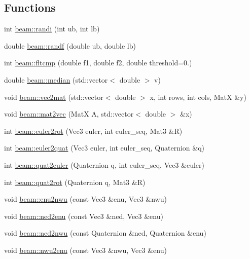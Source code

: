 \subsection*{Functions}
\begin{DoxyCompactItemize}
\item 
int \hyperlink{group__utils_ga1709c3968d710a88b5cc6b034358ff4b}{beam\+::randi} (int ub, int lb)
\item 
double \hyperlink{group__utils_gaf3391ec0a035372eb7fa27646aa97018}{beam\+::randf} (double ub, double lb)
\item 
int \hyperlink{group__utils_gacf5e889cd118230c90c1618324b47644}{beam\+::fltcmp} (double f1, double f2, double threshold=0.)
\item 
double \hyperlink{group__utils_ga78b63ada78026ee09e93e996a6da095b}{beam\+::median} (std\+::vector$<$ double $>$ v)
\item 
void \hyperlink{group__utils_ga1c462df8889ae3641889e12d7491e995}{beam\+::vec2mat} (std\+::vector$<$ double $>$ x, int rows, int cols, MatX \&y)
\item 
void \hyperlink{group__utils_gac7f5f2ea3f1feec3cedfc2b0f61aff90}{beam\+::mat2vec} (MatX A, std\+::vector$<$ double $>$ \&x)
\item 
int \hyperlink{group__utils_ga986bd09d39d65902c831209a1f311819}{beam\+::euler2rot} (Vec3 euler, int euler\+\_\+seq, Mat3 \&R)
\item 
int \hyperlink{group__utils_ga87a6d391d78520ba96a429f65d06bb84}{beam\+::euler2quat} (Vec3 euler, int euler\+\_\+seq, Quaternion \&q)
\item 
int \hyperlink{group__utils_ga15d4558557dc0197de74a7ae56daa53f}{beam\+::quat2euler} (Quaternion q, int euler\+\_\+seq, Vec3 \&euler)
\item 
int \hyperlink{group__utils_ga99cfa04b1c384ead4ae82b4cc4843a5c}{beam\+::quat2rot} (Quaternion q, Mat3 \&R)
\item 
void \hyperlink{group__utils_ga5fe56de851463d297a144a0eb5e7e1b2}{beam\+::enu2nwu} (const Vec3 \&enu, Vec3 \&nwu)
\item 
void \hyperlink{group__utils_ga6e0ef288576925f8c79fd3284743e86c}{beam\+::ned2enu} (const Vec3 \&ned, Vec3 \&enu)
\item 
void \hyperlink{group__utils_ga82aa198fb08b86d9b4fb0854e09acdca}{beam\+::ned2nwu} (const Quaternion \&ned, Quaternion \&enu)
\item 
void \hyperlink{group__utils_gaec5283955c5b5122e00b7fb38b1d69c5}{beam\+::nwu2enu} (const Vec3 \&nwu, Vec3 \&enu)
\item 

\end{DoxyCompactItemize}
